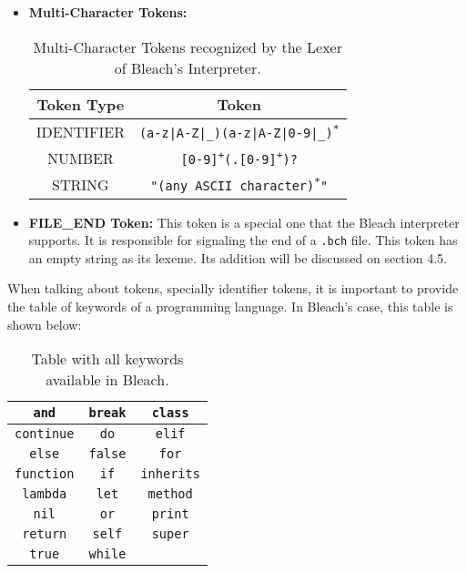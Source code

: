 \begin{itemize}
    \item \textbf{Multi-Character Tokens:}
    \begin{table}[H]
    \centering
        \begin{tabular}{|c|c|}
        \hline
        \textbf{Token Type} & \textbf{Token} \\ \hline
        IDENTIFIER & \texttt{(a-z|A-Z|\_)(a-z|A-Z|0-9|\_)\textsuperscript{*}} \\ \hline
        NUMBER & \texttt{[0-9]\textsuperscript{+}(.[0-9]\textsuperscript{+})?} \\ \hline
        STRING & \texttt{"(any ASCII character)\textsuperscript{*}"} \\ \hline      
        \end{tabular}
        \caption{Multi-Character Tokens recognized by the Lexer of Bleach's Interpreter.}
    \end{table}

    \item \textbf{FILE\_END Token:} This token is a special one that the Bleach interpreter supports. It is responsible for signaling the end of a \texttt{.bch} file. This token has an empty string as its lexeme. Its addition will be discussed on section 4.5.
\end{itemize}

When talking about tokens, specially identifier tokens, it is important to provide the table of keywords of a programming language. In Bleach's case, this table is shown below:
\begin{table}[H]
    \centering
    \begin{tabular}{|c|c|c|}
    \hline
    \texttt{and} & \texttt{break} & \texttt{class}  \\ \hline
    \texttt{continue} & \texttt{do} & \texttt{elif}  \\ \hline
    \texttt{else} & \texttt{false} & \texttt{for}  \\ \hline
    \texttt{function} & \texttt{if} & \texttt{inherits} \\ \hline
    \texttt{lambda} & \texttt{let} & \texttt{method} \\ \hline
    \texttt{nil} & \texttt{or} & \texttt{print} \\ \hline
    \texttt{return} & \texttt{self} & \texttt{super} \\ \hline
    \texttt{true} & \texttt{while} &  \\ \hline
    \end{tabular}
    \caption{Table with all keywords available in Bleach.}
\end{table}

